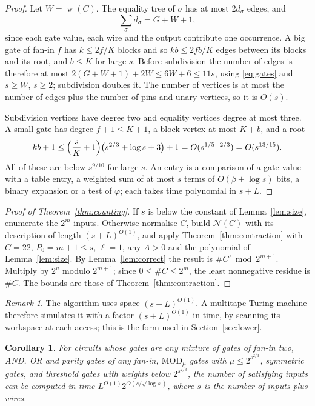 \documentclass[11pt,reqno]{amsart}
\numberwithin{equation}{section}
\theoremstyle{plain}
\newtheorem{corollary}[theorem]{Corollary}
\theoremstyle{definition}
\theoremstyle{remark}
\newtheorem{remark}[theorem]{Remark}
\DeclareMathOperator{\wires}{w}
\newcommand{\cN}{\mathcal{N}}
\begin{document}
\begin{proof}
Let $W=\wires(C)$. The equality tree of $\sigma$ has at most $2d_\sigma$ edges, and
\[
\sum_\sigma d_\sigma=G+W+1,
\]
since each gate value, each wire and the output contribute one occurrence. A big
gate of fan-in $f$ has $k\le2f/K$ blocks and so $kb\le2fb/K$ edges between its
blocks and its root, and $b\le K$ for large $s$. Before subdivision the number
of edges is therefore at most $2(G+W+1)+2W\le6W+6\le11s$, using
\eqref{eq:gates} and $s\ge W$, $s\ge2$; subdivision doubles it. The number of
vertices is at most the number of edges plus the number of pins and unary
vertices, so it is $O(s)$.

Subdivision vertices have degree two and equality vertices degree at most
three. A small gate has degree $f+1\le K+1$, a block vertex at most $K+b$, and a
root
\[
kb+1\le\Bigl(\frac{s}{K}+1\Bigr)\bigl(s^{2/3}+\log s+3\bigr)+1=O(s^{1/5+2/3})=O(s^{13/15}).
\]
All of these are below $s^{9/10}$ for large $s$. An entry is a comparison of a
gate value with a table entry, a weighted sum of at most $s$ terms of $O(\beta+
\log s)$ bits, a binary expansion or a test of $\varphi$; each takes time
polynomial in $s+L$.
\end{proof}

\begin{proof}[Proof of Theorem~\ref{thm:counting}]
If $s$ is below the constant of Lemma~\ref{lem:size}, enumerate the $2^m$ inputs.
Otherwise normalise $C$, build $\cN(C)$ with its description of length
$(s+L)^{O(1)}$, and apply Theorem~\ref{thm:contraction} with $C=22$,
$P_0=m+1\le s$, $\ell=1$, any $A>0$ and the polynomial of Lemma~\ref{lem:size}.
By Lemma~\ref{lem:correct} the result is $\#C'\bmod2^{m+1}$. Multiply by $2^u$
modulo $2^{m+1}$; since $0\le\#C\le2^m$, the least nonnegative residue is $\#C$.
The bounds are those of Theorem~\ref{thm:contraction}.
\end{proof}

\begin{remark}\label{rem:space}
The algorithm uses space $(s+L)^{O(1)}$. A multitape Turing machine therefore
simulates it with a factor $(s+L)^{O(1)}$ in time, by scanning its workspace at
each access; this is the form used in Section~\ref{sec:lower}.
\end{remark}

\begin{corollary}\label{cor:classes}
For circuits whose gates are any mixture of gates of fan-in two, AND, OR and
parity gates of any fan-in, $\mathrm{MOD}_\mu$ gates with $\mu\le2^{s^{2/3}}$,
symmetric gates, and threshold gates with weights below $2^{s^{2/3}}$, the
number of satisfying inputs can be computed in time $L^{O(1)}2^{O(s/\sqrt{\log
s})}$, where $s$ is the number of inputs plus wires.
\end{corollary}
\end{document}
